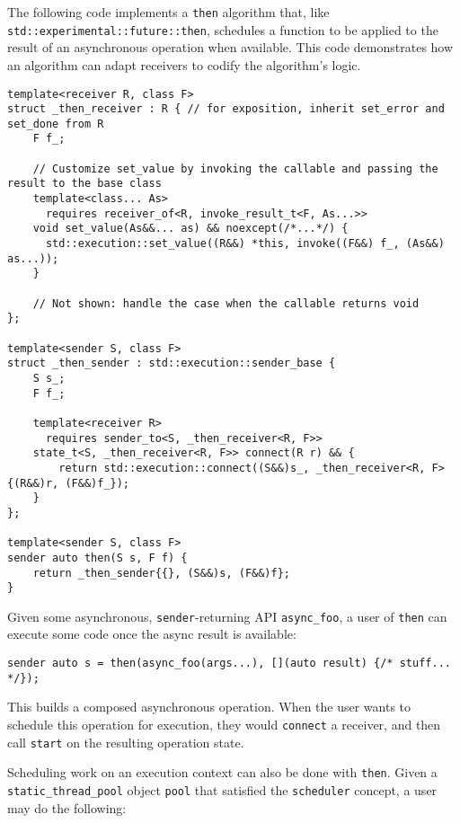 \documentclass[a4paper,12pt,notitlepage,twoside,openright]{article}
\begin{document}
The following code implements a \texttt{then} algorithm
that, like \texttt{std::experimental::future::then},
schedules a function to be applied to the result of an asynchronous
operation when available. This code demonstrates how an algorithm can
adapt receivers to codify the algorithm's logic.

\begin{verbatim}
template<receiver R, class F>
struct _then_receiver : R { // for exposition, inherit set_error and set_done from R
    F f_;

    // Customize set_value by invoking the callable and passing the result to the base class
    template<class... As>
      requires receiver_of<R, invoke_result_t<F, As...>>
    void set_value(As&&... as) && noexcept(/*...*/) {
      std::execution::set_value((R&&) *this, invoke((F&&) f_, (As&&) as...));
    }

    // Not shown: handle the case when the callable returns void
};

template<sender S, class F>
struct _then_sender : std::execution::sender_base {
    S s_;
    F f_;

    template<receiver R>
      requires sender_to<S, _then_receiver<R, F>>
    state_t<S, _then_receiver<R, F>> connect(R r) && {
        return std::execution::connect((S&&)s_, _then_receiver<R, F>{(R&&)r, (F&&)f_});
    }
};

template<sender S, class F>
sender auto then(S s, F f) {
    return _then_sender{{}, (S&&)s, (F&&)f};
}
\end{verbatim}

Given some asynchronous, \texttt{sender}-returning API
\texttt{async_foo}, a user of \texttt{then} can
execute some code once the async result is available:

\begin{verbatim}
sender auto s = then(async_foo(args...), [](auto result) {/* stuff... */});
\end{verbatim}

This builds a composed asynchronous operation. When the user wants to
schedule this operation for execution, they would
\texttt{connect} a receiver, and then call
\texttt{start} on the resulting operation state.

Scheduling work on an execution context can also be done with
\texttt{then}. Given a
\texttt{static_thread_pool} object \texttt{pool}
that satisfied the \texttt{scheduler} concept, a user may do
the following:
\end{document}
